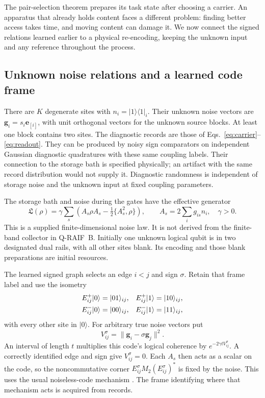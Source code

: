 \documentclass[11pt]{article}
\theoremstyle{definition}
\theoremstyle{remark}
\begin{document}
The pair-selection theorem prepares its task state after choosing a carrier.
An apparatus that already holds content faces a different problem: finding
better access takes time, and moving content can damage it. We now connect
the signed relations learned earlier to a physical re-encoding, keeping the
unknown input and any reference throughout the process.

\subsection{Unknown noise relations and a learned code frame}

There are $K$ degenerate sites with $n_i=|1\rangle\langle1|_i$. Their unknown
noise vectors are $\boldsymbol g_i=s_i\boldsymbol e_{[i]}$, with unit orthogonal
vectors for the unknown source blocks. At least one block contains two sites.
The diagnostic records are those of Eqs.~\eqref{eq:carrier}--\eqref{eq:readout}.
They can be produced by noisy sign comparators on independent Gaussian
diagnostic quadratures with these same coupling labels. Their connection
to the storage bath is specified physically; an artifact with the same
record distribution would not supply it. Diagnostic randomness is independent
of storage noise and the unknown input at fixed coupling parameters.

The storage bath and noise during the gates have the effective generator
\begin{equation}\label{eq:carrier-noise}
 \mathfrak L(\rho)=\gamma\sum_s
 \left(A_s\rho A_s-\tfrac12\{A_s^2,\rho\}\right),\qquad
 A_s=2\sum_i g_{is}n_i,\quad\gamma>0.
\end{equation}
This is a supplied finite-dimensional noise law. It is not derived from the
finite-band collector in Q-RAIF~B. Initially one unknown logical qubit is in
two designated dual rails, with all other sites blank. Its encoding and those
blank preparations are initial resources.

The learned signed graph selects an edge $i<j$ and sign $\sigma$. Retain that
frame label and use the isometry
\begin{align}
 E_{ij}^+|0\rangle&=|01\rangle_{ij},&
 E_{ij}^+|1\rangle&=|10\rangle_{ij},\notag\\
 E_{ij}^-|0\rangle&=|00\rangle_{ij},&
 E_{ij}^-|1\rangle&=|11\rangle_{ij},
 \label{eq:formed-frame}
\end{align}
with every other site in $|0\rangle$. For arbitrary true noise vectors put
\begin{equation}\label{eq:formed-variance}
 V_{ij}^\sigma=\|\boldsymbol g_i-\sigma\boldsymbol g_j\|^2.
\end{equation}
An interval of length $t$ multiplies this code's logical coherence by
$e^{-2\gamma tV_{ij}^\sigma}$. A correctly identified edge and sign give
$V_{ij}^\sigma=0$. Each $A_s$ then acts as a scalar on the code, so the
noncommutative corner $E_{ij}^\sigma M_2(E_{ij}^\sigma)^*$ is fixed by the
noise. This uses the usual noiseless-code mechanism
\cite{ZanardiRasetti1997}. The frame identifying where that mechanism acts
is acquired from records.
\end{document}
